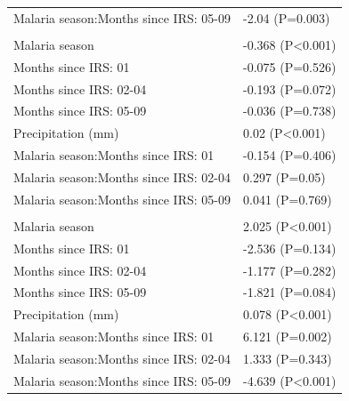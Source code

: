 \documentclass[]{article}
\begin{document}
\begin{table}
\begin{tabular}[t]{ll}
\hspace{1em}Malaria season:Months since IRS: 05-09 & -2.04 (P=0.003)\\
\addlinespace[1.5em]
\multicolumn{2}{l}{\textbf{Temporary field worker}}\\
\hspace{1em}Malaria season & -0.368 (P<0.001)\\
\hspace{1em}Months since IRS: 01 & -0.075 (P=0.526)\\
\hspace{1em}Months since IRS: 02-04 & -0.193 (P=0.072)\\
\hspace{1em}Months since IRS: 05-09 & -0.036 (P=0.738)\\
\hspace{1em}Precipitation (mm) & 0.02 (P<0.001)\\
\hspace{1em}Malaria season:Months since IRS: 01 & -0.154 (P=0.406)\\
\hspace{1em}Malaria season:Months since IRS: 02-04 & 0.297 (P=0.05)\\
\hspace{1em}Malaria season:Months since IRS: 05-09 & 0.041 (P=0.769)\\
\addlinespace[1.5em]
\multicolumn{2}{l}{\textbf{Temporary not field worker}}\\
\hspace{1em}Malaria season & 2.025 (P<0.001)\\
\hspace{1em}Months since IRS: 01 & -2.536 (P=0.134)\\
\hspace{1em}Months since IRS: 02-04 & -1.177 (P=0.282)\\
\hspace{1em}Months since IRS: 05-09 & -1.821 (P=0.084)\\
\hspace{1em}Precipitation (mm) & 0.078 (P<0.001)\\
\hspace{1em}Malaria season:Months since IRS: 01 & 6.121 (P=0.002)\\
\hspace{1em}Malaria season:Months since IRS: 02-04 & 1.333 (P=0.343)\\
\hspace{1em}Malaria season:Months since IRS: 05-09 & -4.639 (P<0.001)\\
\bottomrule
\end{tabular}
\end{table}
\end{document}
